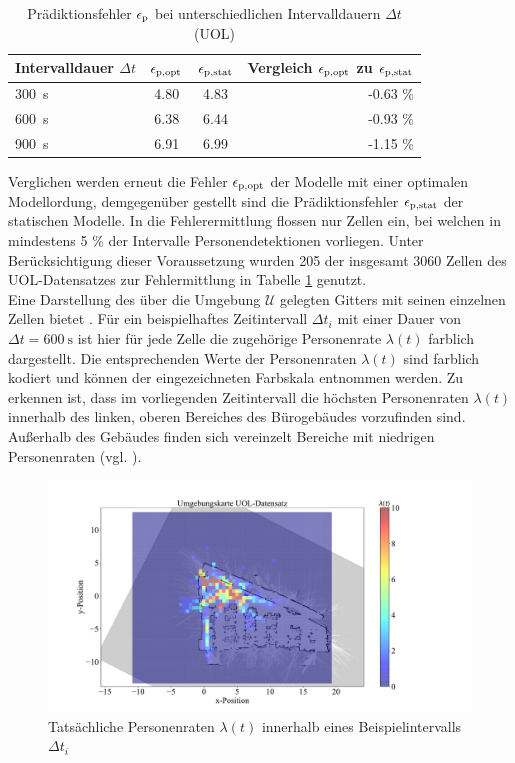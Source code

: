 \begin{table}[!h]
	\centering
	\caption{Prädiktionsfehler $\epsilon_{\mathrm{p}}$ bei unterschiedlichen Intervalldauern  $\Delta t$ (UOL)}\label{tab.Prädiktionsfehler uol_float}
	\vspace*{-3mm}
	\begin{tabular}{lccr}
		\toprule
		Intervalldauer $\Delta t$		& $\epsilon_{\mathrm{p,opt}}$	&  $\epsilon_{\mathrm{p,stat}}$  & Vergleich $\epsilon_{\mathrm{p,opt}}$ zu $\epsilon_{\mathrm{p,stat}}$              \\
		\midrule
		\SI{300}{\second}	& 4.80           & 4.83 & -0.63 \% \\
		\rowcolor{Snow2}
		\SI{600}{\second} 	& 6.38           & 6.44 & -0.93 \% \\
		\SI{900}{\second}			& 6.91           & 6.99 & -1.15 \% \\
		\bottomrule
	\end{tabular} 
\end{table}
Verglichen werden erneut die Fehler $\epsilon_{\mathrm{p,opt}}$ der Modelle mit einer optimalen Modellordung, demgegenüber gestellt sind die Prädiktionsfehler $\epsilon_{\mathrm{p,stat}}$ der statischen Modelle. In die Fehlerermittlung flossen nur Zellen ein, bei welchen in mindestens 5 \% der Intervalle Personendetektionen vorliegen. Unter Berücksichtigung dieser Voraussetzung wurden 205 der insgesamt 3060 Zellen des UOL-Datensatzes zur Fehlermittlung in Tabelle \ref{tab.Prädiktionsfehler uol_float} genutzt. \\
\newpage
Eine Darstellung des über die Umgebung $\mathcal{U}$ gelegten Gitters mit seinen einzelnen Zellen bietet . Für ein beispielhaftes Zeitintervall $\Delta t_i$ mit einer Dauer von $\Delta t = \SI{600}{\second}$ ist hier für jede Zelle die zugehörige Personenrate $\lambda (t)$ farblich dargestellt. Die entsprechenden Werte der Personenraten $\lambda (t)$ sind farblich kodiert und können der eingezeichneten Farbskala entnommen werden. Zu erkennen ist, dass im vorliegenden Zeitintervall die höchsten Personenraten $\lambda (t)$ innerhalb des linken, oberen Bereiches des Bürogebäudes vorzufinden sind. Außerhalb des Gebäudes finden sich vereinzelt Bereiche mit niedrigen Personenraten (vgl. ).
\begin{figure}[!h]
	\centering
	\includegraphics[width=1.0\linewidth]{Abbildungen/evaluation/original_float_data}
	\caption{Tatsächliche Personenraten $\lambda(t)$ innerhalb eines Beispielintervalls $\Delta t_i$}
	\label{fig.original_float_data}
\end{figure}

